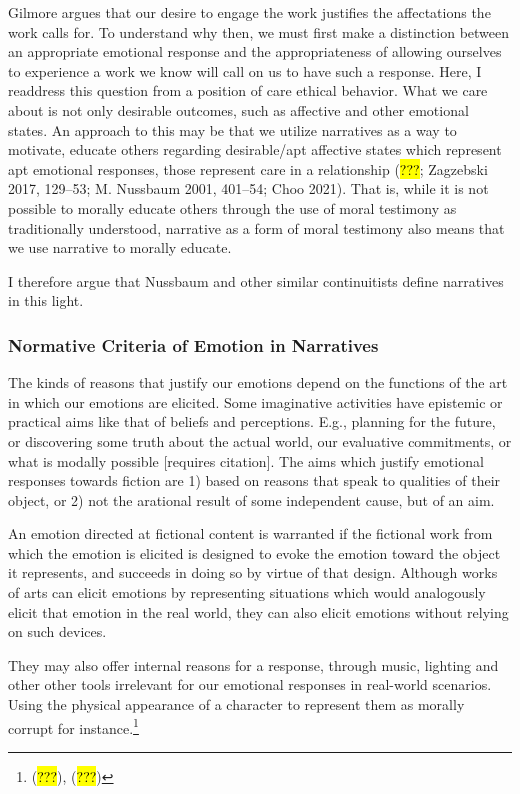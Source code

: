 \documentclass[
  letterpaper,
  DIV=11,
  numbers=noendperiod]{scrartcl}
\theoremstyle{remark}
\begin{document}
Gilmore argues that our desire to engage the work justifies the
affectations the work calls for. To understand why then, we must first
make a distinction between an appropriate emotional response and the
appropriateness of allowing ourselves to experience a work we know will
call on us to have such a response. Here, I readdress this question from
a position of care ethical behavior. What we care about is not only
desirable outcomes, such as affective and other emotional states. An
approach to this may be that we utilize narratives as a way to motivate,
educate others regarding desirable/apt affective states which represent
apt emotional responses, those represent care in a relationship
(\hl{???}; Zagzebski 2017, 129--53; M. Nussbaum 2001, 401--54; Choo
2021). That is, while it is not possible to morally educate others
through the use of moral testimony as traditionally understood,
narrative as a form of moral testimony also means that we use narrative
to morally educate.

I therefore argue that Nussbaum and other similar continuitists define
narratives in this light.

\subsubsection{Normative Criteria of Emotion in
Narratives}\label{normative-criteria-of-emotion-in-narratives}

The kinds of reasons that justify our emotions depend on the functions
of the art in which our emotions are elicited. Some imaginative
activities have epistemic or practical aims like that of beliefs and
perceptions. E.g., planning for the future, or discovering some truth
about the actual world, our evaluative commitments, or what is modally
possible {[}requires citation{]}. The aims which justify emotional
responses towards fiction are 1) based on reasons that speak to
qualities of their object, or 2) not the arational result of some
independent cause, but of an aim.

An emotion directed at fictional content is warranted if the fictional
work from which the emotion is elicited is designed to evoke the emotion
toward the object it represents, and succeeds in doing so by virtue of
that design. Although works of arts can elicit emotions by representing
situations which would analogously elicit that emotion in the real
world, they can also elicit emotions without relying on such devices.

They may also offer internal reasons for a response, through music,
lighting and other other tools irrelevant for our emotional responses in
real-world scenarios. Using the physical appearance of a character to
represent them as morally corrupt for instance.\footnote{(\hl{???}),
  (\hl{???})}
\end{document}

